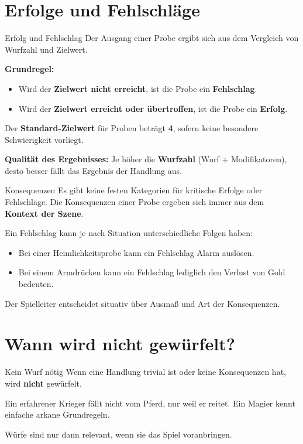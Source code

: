 \section{Erfolge und Fehlschläge}

\begin{rulebox}{Erfolg und Fehlschlag}
	Der Ausgang einer Probe ergibt sich aus dem Vergleich von
	Wurfzahl und Zielwert.
\end{rulebox}

\textbf{Grundregel:}
\begin{itemize}
	\item Wird der \textbf{Zielwert nicht erreicht}, ist die Probe ein \textbf{Fehlschlag}.
	\item Wird der \textbf{Zielwert erreicht oder übertroffen}, ist die Probe ein \textbf{Erfolg}.
\end{itemize}

Der \textbf{Standard-Zielwert} für Proben beträgt \textbf{4}, sofern keine besondere
Schwierigkeit vorliegt.

\medskip

\textbf{Qualität des Ergebnisses:}  
Je höher die \textbf{Wurfzahl} (Wurf + Modifikatoren), desto besser fällt das
Ergebnis der Handlung aus.

\begin{rulebox}{Konsequenzen}
	Es gibt keine festen Kategorien für kritische Erfolge oder Fehlschläge.
	Die Konsequenzen einer Probe ergeben sich immer aus dem \textbf{Kontext der Szene}.
\end{rulebox}

Ein Fehlschlag kann je nach Situation unterschiedliche Folgen haben:
\begin{itemize}
	\item Bei einer Heimlichkeitsprobe kann ein Fehlschlag Alarm auslösen.
	\item Bei einem Armdrücken kann ein Fehlschlag lediglich den Verlust von Gold bedeuten.
\end{itemize}

Der Spielleiter entscheidet situativ über Ausmaß und Art der Konsequenzen.


\section{Wann wird nicht gewürfelt?}

\begin{rulebox}{Kein Wurf nötig}
	Wenn eine Handlung trivial ist oder keine Konsequenzen hat, wird \textbf{nicht}
	gewürfelt.
\end{rulebox}

Ein erfahrener Krieger fällt nicht vom Pferd, nur weil er reitet.  
Ein Magier kennt einfache arkane Grundregeln.

Würfe sind nur dann relevant, wenn sie das Spiel voranbringen.

